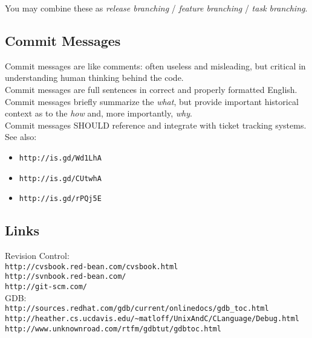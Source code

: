 \documentclass[xga]{xdvislides}
\begin{document}
You may combine these as {\em release branching} /
{\em feature branching} / {\em task branching}.

\subsection{Commit Messages}

Commit messages are like comments: often useless and
misleading, but critical in understanding human
thinking behind the code. \\

Commit messages are full sentences in correct and
properly formatted English.
\\

Commit messages briefly summarize the {\em what}, but
provide important historical context as to the {\em
how} and, more importantly, {\em why}. \\

Commit messages SHOULD reference and integrate with
ticket tracking systems. \\

See also:
\begin{itemize}
	\item \verb+http://is.gd/Wd1LhA+
	\item \verb+http://is.gd/CUtwhA+
	\item \verb+http://is.gd/rPQj5E+
\end{itemize}

\subsection{Links}
Revision Control: \\
{\tt http://cvsbook.red-bean.com/cvsbook.html} \\

{\tt http://svnbook.red-bean.com/} \\

{\tt http://git-scm.com/} \\

GDB: \\
{\tt http://sources.redhat.com/gdb/current/onlinedocs/gdb\_toc.html} \\

\verb+http://heather.cs.ucdavis.edu/~matloff/UnixAndC/CLanguage/Debug.html+ \\

{\tt http://www.unknownroad.com/rtfm/gdbtut/gdbtoc.html}
\end{document}
